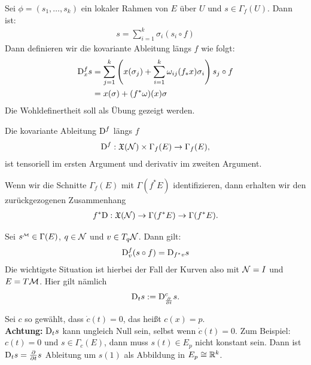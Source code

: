 \begin{defs}
Sei $\phi = (s_1, \dots, s_k)$ ein lokaler Rahmen von $E$ über $U$ und $s \in \Gamma_f (U)$. 
Dann ist:
\begin{align}
s = \sum^{k}_{i=1} \sigma_i (s_i \circ f)
\end{align}
Dann definieren wir die kovariante Ableitung längs $f$ wie folgt:
\begin{align}
\mathrm{D}^{f}_x s &= \sum^k_{j=1} \left( x(\sigma_j) + \sum^k_{i=1} \omega_{ij}(f_\ast x)\sigma_i \right) s_j \circ f\\
&= x(\sigma) + (f^\ast \omega)(x) \sigma
\end{align}
Die Wohldefinertheit soll als Übung gezeigt werden.
\end{defs}
\begin{satz}
Die kovariante Ableitung $\mathrm{D}^f$ längs $f$
\begin{align}
\mathrm{D}^f: \mathfrak{X}(\mathcal{N}) \times \Gamma_f (E) \to \Gamma_f (E),
\end{align}
ist tensoriell im ersten Argument und derivativ im zweiten Argument.
\end{satz}
Wenn wir die Schnitte $\Gamma_f (E)$ mit $\Gamma(f^\ast E)$ identifizieren, dann erhalten wir den zurückgezogenen Zusammenhang
\begin{align}
f^\ast \mathrm{D} : \mathfrak{X}(\mathcal{N}) \to \Gamma(f^\ast E) \to \Gamma(f^\ast E).
\end{align}
\begin{satz}
Sei $s^\text{{\begin{tiny}$\mfk$\end{tiny}}} \in \Gamma(E)$, $q \in \mathcal{N}$ und $v\in T_q \mathcal{N}$.
Dann gilt:
\begin{align}
\mathrm{D}^f_v (s\circ f) = \mathrm{D}_{f^\ast v} s
\end{align}
Die wichtigste Situation ist hierbei der Fall der Kurven also mit $\mathcal{N} = I$ und $E = T\mathcal{M}$.
Hier gilt nämlich
\begin{align}
\mathrm{D}_t s := \mathrm{D}^c_{\pdv{t}} s.
\end{align}
\end{satz}
\begin{bem}
Sei $c$ so gewählt, dass $\dot{c}(t) = 0$, das heißt $c(x)=p$.\\
\textbf{Achtung:} $\mathrm{D}_t s$ kann ungleich Null sein, selbst wenn $\dot{c}(t) = 0$.
Zum Beispiel: $c(t)=0$ und $s \in \Gamma_c (E)$, dann muss $s(t) \in E_p$ nicht konstant sein.
Dann ist $\mathrm{D}_t s = \pdv{t} s $ Ableitung um $s(1)$ als Abbildung in $E_p \cong \mathbb{R}^k$.
\end{bem}
